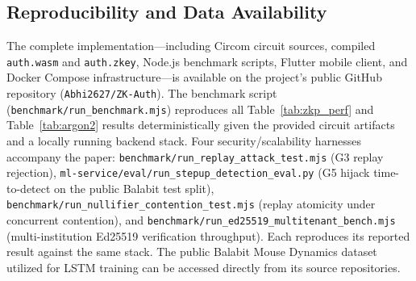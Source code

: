 \documentclass[journal,twoside,10pt]{IEEEtran}
\begin{document}
\subsection*{Reproducibility and Data Availability}
\label{sec:reproducibility}
The complete implementation---including Circom circuit sources, compiled
\texttt{auth.wasm} and \texttt{auth.zkey}, Node.js benchmark scripts,
Flutter mobile client, and Docker Compose infrastructure---is available on
the project's public GitHub repository (\texttt{Abhi2627/ZK-Auth}). The
benchmark script (\texttt{benchmark/run\_benchmark.mjs}) reproduces all
Table~\ref{tab:zkp_perf} and Table~\ref{tab:argon2} results deterministically
given the provided circuit artifacts and a locally running backend stack.
Four security/scalability harnesses accompany the paper:
\texttt{benchmark/\allowbreak run\_replay\_\allowbreak attack\_test.mjs} (G3 replay
rejection),
\texttt{ml-service/\allowbreak eval/\allowbreak run\_stepup\_\allowbreak detection\_eval.py}
(G5 hijack time-to-detect on the public Balabit test split),
\texttt{benchmark/\allowbreak run\_nullifier\_\allowbreak contention\_test.mjs}
(replay atomicity under concurrent contention), and
\texttt{benchmark/\allowbreak run\_ed25519\_\allowbreak multitenant\_bench.mjs}
(multi-institution Ed25519 verification throughput). Each reproduces its
reported result against the same stack. The public Balabit Mouse
Dynamics dataset utilized for LSTM training can be accessed directly from
its source repositories.
\end{document}
